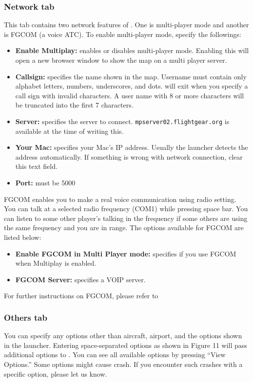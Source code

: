 \subsubsection{Network tab}
This tab contains two network features of \FlightGear{}. One is multi-player mode and another is FGCOM (a voice ATC). To enable multi-player mode, specify the followings:
\begin{itemize}
\item \textbf{Enable Multiplay:} enables or disables multi-player mode. Enabling this will open a new browser window to show the map on a multi player server.
\item \textbf{Callsign:} specifies the name shown in the map. Username must contain only alphabet letters, numbers, underscores, and dots. \FlightGear{} will exit when you specify a call sign with invalid characters. A user name with 8 or more characters will be truncated into the first 7 characters. 
\item \textbf{Server:} specifies the server to connect. \texttt{mpserver02.flightgear.org} is available at the time of writing this.
\item \textbf{Your Mac:} specifies your Mac's IP address. Usually the launcher detects the address automatically. If something is wrong with network connection, clear this text field.
\item \textbf{Port:} must be 5000
\end{itemize}

FGCOM enables you to make a real voice communication using radio setting. You can talk at a selected radio frequency (COM1) while pressing space bar. You can listen to some other player's talking in the frequency if some others are using the same frequency and you are in range. The options available for FGCOM are listed below:

\begin{itemize}
\item \textbf{Enable FGCOM in Multi Player mode:} specifies if you use FGCOM when Multiplay is enabled.
\item \textbf{FGCOM Server:} specifies a VOIP server.
\end{itemize}

For further instructions on FGCOM, please refer to 

\subsubsection{Others tab}
You can specify any options other than aircraft, airport, and the options shown in the launcher. Entering space-separated options as shown in Figure 11 will pass additional options to \FlightGear{}. You can see all available options by pressing ``View Options.'' Some options might cause \FlightGear{} crash. If you encounter such crashes with a specific option, please let us know.

